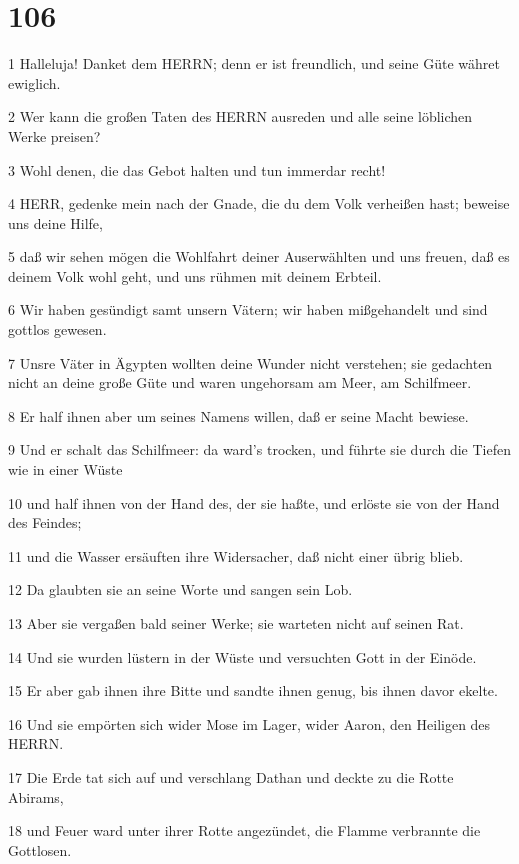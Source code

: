 \chapter{106}

\par 1 Halleluja! Danket dem HERRN; denn er ist freundlich, und seine Güte währet ewiglich.
\par 2 Wer kann die großen Taten des HERRN ausreden und alle seine löblichen Werke preisen?
\par 3 Wohl denen, die das Gebot halten und tun immerdar recht!
\par 4 HERR, gedenke mein nach der Gnade, die du dem Volk verheißen hast; beweise uns deine Hilfe,
\par 5 daß wir sehen mögen die Wohlfahrt deiner Auserwählten und uns freuen, daß es deinem Volk wohl geht, und uns rühmen mit deinem Erbteil.
\par 6 Wir haben gesündigt samt unsern Vätern; wir haben mißgehandelt und sind gottlos gewesen.
\par 7 Unsre Väter in Ägypten wollten deine Wunder nicht verstehen; sie gedachten nicht an deine große Güte und waren ungehorsam am Meer, am Schilfmeer.
\par 8 Er half ihnen aber um seines Namens willen, daß er seine Macht bewiese.
\par 9 Und er schalt das Schilfmeer: da ward's trocken, und führte sie durch die Tiefen wie in einer Wüste
\par 10 und half ihnen von der Hand des, der sie haßte, und erlöste sie von der Hand des Feindes;
\par 11 und die Wasser ersäuften ihre Widersacher, daß nicht einer übrig blieb.
\par 12 Da glaubten sie an seine Worte und sangen sein Lob.
\par 13 Aber sie vergaßen bald seiner Werke; sie warteten nicht auf seinen Rat.
\par 14 Und sie wurden lüstern in der Wüste und versuchten Gott in der Einöde.
\par 15 Er aber gab ihnen ihre Bitte und sandte ihnen genug, bis ihnen davor ekelte.
\par 16 Und sie empörten sich wider Mose im Lager, wider Aaron, den Heiligen des HERRN.
\par 17 Die Erde tat sich auf und verschlang Dathan und deckte zu die Rotte Abirams,
\par 18 und Feuer ward unter ihrer Rotte angezündet, die Flamme verbrannte die Gottlosen.
